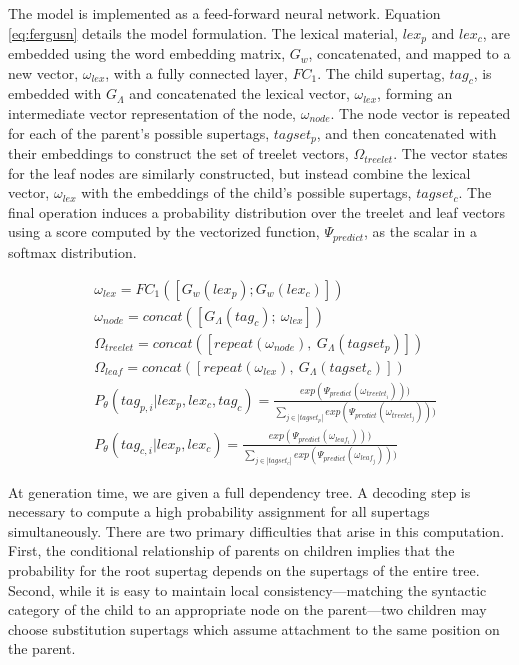 \documentclass[11pt]{article}
\begin{document}
The model is implemented as a feed-forward neural network.
%
Equation \ref{eq:fergusn} details the model formulation.
%
The lexical material, $lex_p$ and $lex_c$, are embedded using the word embedding matrix, $G_w$, concatenated, and mapped to a new vector, $\omega_{lex}$, with a fully connected layer, $FC_1$.
%
The child supertag, $tag_c$, is embedded with $G_\Lambda$ and concatenated the lexical vector, $\omega_{lex}$, forming an intermediate vector representation of the node, $\omega_{node}$.
%
The node vector is repeated for each of the parent's possible supertags, $tagset_p$, and then concatenated with their embeddings to construct the set of treelet vectors, $\Omega_{treelet}$.
%
The vector states for the leaf nodes are similarly constructed, but instead combine the lexical vector, $\omega_{lex}$ with the embeddings of the child's possible supertags, $tagset_c$.
%
The final operation induces a probability distribution over the treelet and leaf vectors using a score computed by the vectorized function, $\Psi_{predict}$, as the scalar in a softmax distribution. 


\begin{align}
&\omega_{lex} = FC_1([G_w(lex_p); G_w(lex_c)]) \label{eq:fergusn} \\
&\omega_{node}=concat([G_\Lambda(tag_c);~\omega_{lex}]) \nonumber \\
&\Omega_{treelet} = concat([repeat(\omega_{node}),~G_\Lambda(tagset_p)]) \nonumber \\
&\Omega_{leaf} = concat([repeat(\omega_{lex}),~G_\Lambda(tagset_c)]) \nonumber \\
&P_\theta(tag_{p,i} | lex_{p}, lex_{c}, tag_{c})=
\frac{exp(\Psi_{predict}(\omega_{treelet_i})))}
{\sum_{j \in |tagset_p|} exp(\Psi_{predict}(\omega_{treelet_j})))} \nonumber \\
&P_\theta(tag_{c,i} |lex_{p}, lex_{c}) = 
\frac{exp(\Psi_{predict}(\omega_{leaf_i})))}
{\sum_{j \in |tagset_c|} exp(\Psi_{predict}(\omega_{leaf_j})))} \nonumber 
\end{align}

At generation time, we are given a full dependency tree.  A decoding
step is necessary to compute a high probability
assignment for all supertags simultaneously.
%
There are two primary difficulties that arise in this computation.
%
First, the conditional relationship of parents on children implies that the probability for the root supertag depends on the supertags of the entire tree.
%
Second, while it is easy to maintain local consistency---matching the syntactic
category of the child to an appropriate node on the parent---two children may choose substitution supertags which assume attachment to the same position on the parent.
\end{document}
